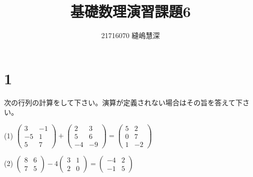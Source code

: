 \documentclass[fleqn]{jsarticle}
\title{基礎数理演習課題6}
\author{21716070 縫嶋慧深}
\begin{document}
	\maketitle

    \section*{1}
    次の行列の計算をして下さい。演算が定義されない場合はその旨を答えて下さい。\\
    \begin{description}
		\setlength{\itemsep}{0.5cm}
        \begin{spacing}{1.2}

            \item[(1)]
                $ \left(
                    \begin{array}{cc}
                        3 & -1 \\
                        -5 & 1 \\
                        5 & 7
                    \end{array}
                \right)
                +
                \left(
                    \begin{array}{cc}
                        2 & 3 \\
                        5 & 6 \\
                        -4 & -9
                    \end{array}
                \right)
                =
                \left(
                    \begin{array}{cc}
                        5 & 2 \\
                        0 & 7 \\
                        1 & -2
                    \end{array}
                \right) $ \\

            \item[(2)]
                $ \left(
                    \begin{array}{cc}
                        8 & 6 \\
                        7 & 5
                    \end{array}
                \right)
                -
                4 \left(
                    \begin{array}{cc}
                        3 & 1 \\
                        2 & 0
                    \end{array}
                \right)
                =
                \left(
                    \begin{array}{cc}
                        -4 & 2 \\
                        -1 & 5
                    \end{array}
                \right) $ \\


\end{spacing}
\end{description}
\end{document}
